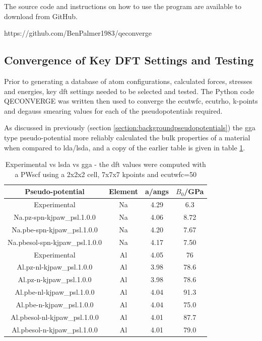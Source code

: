 The source code and instructions on how to use the program are available to download from GitHub.

https://github.com/BenPalmer1983/qeconverge












\FloatBarrier
\subsection[DFT Parameter Convergence]{Convergence of Key DFT Settings and Testing}

Prior to generating a database of atom configurations, calculated forces, stresses and energies, key \acrshort{dft} settings needed to be selected and tested.  The Python code QECONVERGE was written then used to converge the ecutwfc, ecutrho, k-points and degauss smearing values for each of the pseudopotentials required.
  
As discussed in previously (section \ref{section:backgroundpseudopotentials}) the \acrshort{gga} type pseudo-potential more reliably calculated the bulk properties of a material when compared to \acrshort{lda}/\acrshort{lsda}, and a copy of the earlier table is given in table \ref{table:ggavslsdacopy}.

\FloatBarrier 
\begin{table}[h]
\begin{center}
\renewcommand{\arraystretch}{1.2}
\begin{tabular}{c c c c}
\hline\hline
Pseudo-potential & Element & a/angs & $B_0$/GPa \\
\hline\hline
Experimental    & Na      & 4.29\cite{periodictablena} & 6.3\cite{periodictablena} \\
Na.pz-spn-kjpaw\_psl.1.0.0 & Na & 4.06 & 8.72 \\
Na.pbe-spn-kjpaw\_psl.1.0.0 & Na & 4.20 & 7.67 \\
Na.pbesol-spn-kjpaw\_psl.1.0.0 & Na & 4.17 & 7.50 \\
Experimental    & Al      & 4.05\cite{periodictableal} & 76\cite{periodictableal} \\
Al.pz-nl-kjpaw\_psl.1.0.0 & Al & 3.98 & 78.6 \\
Al.pz-n-kjpaw\_psl.1.0.0 & Al & 3.98 & 78.6 \\
Al.pbe-nl-kjpaw\_psl.1.0.0 & Al & 4.04 & 91.3 \\
Al.pbe-n-kjpaw\_psl.1.0.0 & Al & 4.04 & 75.0 \\
Al.pbesol-nl-kjpaw\_psl.1.0.0 & Al & 4.01 & 87.7 \\
Al.pbesol-n-kjpaw\_psl.1.0.0 & Al & 4.01 & 79.0 \\
\hline\hline
\end{tabular}
\end{center}
\caption{Experimental vs \acrshort{lsda} vs \acrshort{gga} - the \acrshort{dft} values were computed with a PWscf\cite{quantumespresso} using a 2x2x2 cell, 7x7x7 kpoints and ecutwfc=50}
\label{table:ggavslsdacopy}
\end{table}

